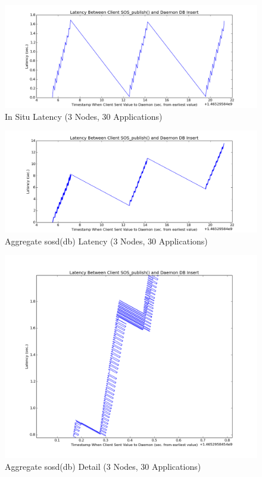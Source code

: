 \begin{figure}[h]
\centering
\includegraphics[width=\columnwidth]{images/aciss_latency_3_situ.png}
\caption{In Situ Latency (3 Nodes, 30 Applications)}
\label{aciss_lat_3_situ}
\end{figure}

\begin{figure}[h]
\centering
\includegraphics[width=\columnwidth]{images/aciss_latency_3_agg.png}
\caption{Aggregate sosd(db) Latency (3 Nodes, 30 Applications)}
\label{aciss_lat_3_agg}
\end{figure}

\begin{figure}[h]
\centering
\includegraphics[width=\columnwidth]{images/aciss_latency_3_agg_zm.png}
\caption{Aggregate sosd(db) Detail (3 Nodes, 30 Applications)}
\label{aciss_lat_3_agg_detail}
\end{figure}

